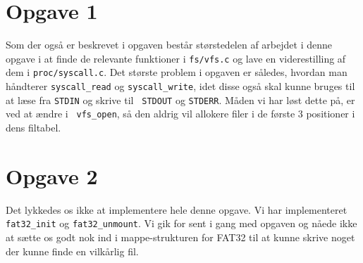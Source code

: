 



\maketitle

\tableofcontents

\thispagestyle{empty}

\section{Opgave 1}
Som der også er beskrevet i opgaven består størstedelen af arbejdet i denne
opgave i at finde de relevante funktioner i {\tt fs/vfs.c} og lave en
viderestilling af dem i {\tt proc/syscall.c}. Det største problem i opgaven er
således, hvordan man håndterer {\tt syscall\_read} og {\tt syscall\_write}, idet
disse også skal kunne bruges til at læse fra {\tt STDIN} og skrive til {\tt
STDOUT} og {\tt STDERR}. Måden vi har løst dette på, er ved at ændre i {\tt
vfs\_open}, så den aldrig vil allokere filer i de første 3 positioner i dens
filtabel.

\section{Opgave 2}
Det lykkedes os ikke at implementere hele denne opgave. Vi har implementeret
{\tt fat32\_init} og {\tt fat32\_unmount}. Vi gik for sent i gang med opgaven og
nåede ikke at sætte os godt nok ind i mappe-strukturen for FAT32 til at kunne
skrive noget der kunne finde en vilkårlig fil.


